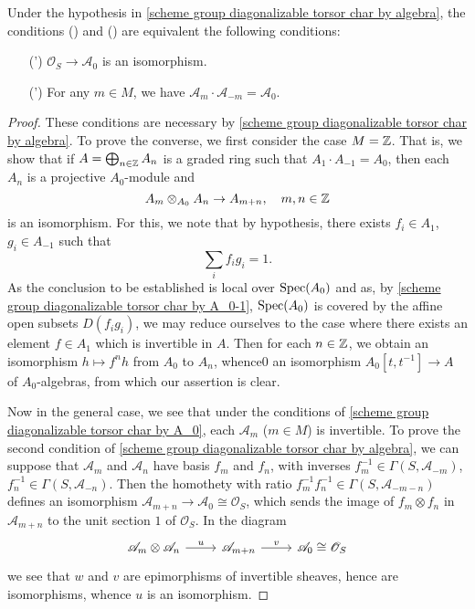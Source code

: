 \begin{proposition}\label{scheme group diagonalizable torsor char by A_0}
Under the hypothesis in \cref{scheme group diagonalizable torsor char by algebra}, the conditions () and () are equivalent the following conditions:
\begin{enumerate}
    \item[(\rmnum{1}')] $\mathscr{O}_S\to\mathscr{A}_0$ is an isomorphism.
    \item[(\rmnum{2}')] For any $m\in M$, we have $\mathscr{A}_m\cdot\mathscr{A}_{-m}=\mathscr{A}_0$.
\end{enumerate}
\end{proposition}
\begin{proof}
These conditions are necessary by \cref{scheme group diagonalizable torsor char by algebra}. To prove the converse, we first consider the case $M=\mathbb{Z}$. That is, we show that if $A=\bigoplus_{n\in \mathbb{Z}}A_n$ is a graded ring such that $A_1\cdot A_{-1}=A_0$, then each $A_n$ is a projective $A_0$-module and
\[A_m\otimes_{A_0}A_n\to A_{m+n},\quad m,n\in\mathbb{Z}\]
is an isomorphism. For this, we note that by hypothesis, there exists $f_i\in A_1$, $g_i\in A_{-1}$ such that
\begin{equation}\label{scheme group diagonalizable torsor char by A_0-1}
\sum_if_ig_i=1.
\end{equation}
As the conclusion to be established is local over $\mathrm{Spec}(A_0)$ and as, by \cref{scheme group diagonalizable torsor char by A_0-1}, $\mathrm{Spec}(A_0)$ is covered by the affine open subsets $D(f_ig_i)$, we may reduce ourselves to the case where there exists an element $f\in A_1$ which is invertible in $A$. Then for each $n\in\mathbb{Z}$, we obtain an isomorphism $h\mapsto f^nh$ from $A_0$ to $A_n$, whence0 an isomorphism $A_0[t,t^{-1}]\to A$ of $A_0$-algebras, from which our assertion is clear.\par
Now in the general case, we see that under the conditions of \cref{scheme group diagonalizable torsor char by A_0}, each $\mathscr{A}_m$ ($m\in M$) is invertible. To prove the second condition of \cref{scheme group diagonalizable torsor char by algebra}, we can suppose that $\mathscr{A}_m$ and $\mathscr{A}_n$ have basis $f_m$ and $f_n$, with inverses $f_m^{-1}\in\Gamma(S,\mathscr{A}_{-m})$, $f_n^{-1}\in\Gamma(S,\mathscr{A}_{-n})$. Then the homothety with ratio $f_m^{-1}f_n^{-1}\in\Gamma(S,\mathscr{A}_{-m-n})$ defines an isomorphism $\mathscr{A}_{m+n}\to\mathscr{A}_0\cong\mathscr{O}_S$, which sends the image of $f_m\otimes f_n$ in $\mathscr{A}_{m+n}$ to the unit section $1$ of $\mathscr{O}_S$. In the diagram
\[\begin{tikzcd}
\mathscr{A}_m\otimes\mathscr{A}_n\ar[r,"u"]&\mathscr{A}_{m+n}\ar[r,"v"]&\mathscr{A}_0\cong\mathscr{O}_S
\end{tikzcd}\]
we see that $w$ and $v$ are epimorphisms of invertible sheaves, hence are isomorphisms, whence $u$ is an isomorphism.
\end{proof}

